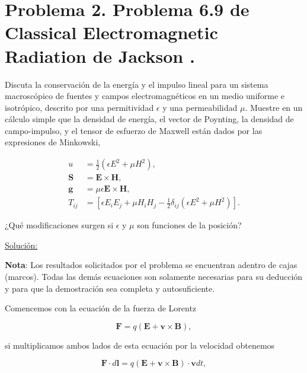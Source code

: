 \documentclass[a4paper,11pt]{article}
\numberwithin{equation}{section}
\begin{document}
\newpage

\section{Problema 2. Problema 6.9 de Classical Electromagnetic Radiation
de Jackson \cite{jackson}.}

Discuta la conservación de la energía y el impulso lineal para un sistema macroscópico 
de fuentes y campos electromagnéticos en un medio uniforme e isotrópico, descrito 
por una permitividad $\epsilon$ y una permeabilidad $\mu$. Muestre en un cálculo 
simple que la densidad de energía, el vector de Poynting, la densidad de campo-impulso, 
y el tensor de esfuerzo de Maxwell están dados por las expresiones de Minkowski,

\begin{align*}
u &= \frac{1}{2}(\epsilon E^2 + \mu H^2), \\
\mathbf{S} &= \mathbf{E} \times \mathbf{H}, \\
\mathbf{g} &= \mu\epsilon \mathbf{E} \times \mathbf{H}, \\
T_{ij} &= [\epsilon E_iE_j + \mu H_iH_j - \frac{1}{2}\delta_{ij}(\epsilon E^2 + \mu H^2)].
\end{align*}

¿Qué modificaciones surgen si $\epsilon$ y $\mu$ son funciones de la posición?

\vspace{.3cm}

\underline{Solución:} \vspace{.3cm}

\begin{mdframed}[linewidth=2]
\textbf{Nota}: Los resultados solicitados por el problema se encuentran adentro 
de cajas (marcos). Todas las demás ecuaciones son solamente necesarias para 
su deducción y para que la demostración sea completa y autosuficiente.
\end{mdframed}

Comencemos con la ecuación de la fuerza de Lorentz 

\begin{equation}
 \mathbf{F} = q(\mathbf{E} + \mathbf{v} \times \mathbf{B}),
\end{equation}

si multiplicamos ambos lados de esta ecuación por la velocidad obtenemos 

\begin{equation}
 \mathbf{F}\cdot d\mathbf{l} = q(\mathbf{E} + \mathbf{v} \times \mathbf{B})\cdot 
 \mathbf{v}dt,
\end{equation}
\end{document}
